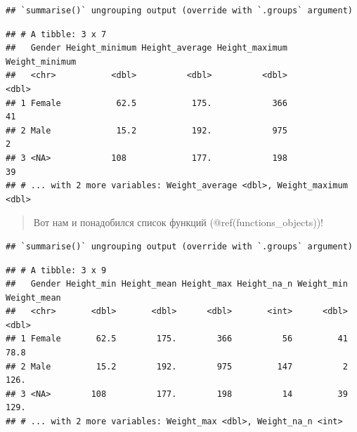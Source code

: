 \documentclass[]{book}
\newenvironment{Shaded}{\begin{snugshade}}{\end{snugshade}}
\newcommand{\KeywordTok}[1]{\textcolor[rgb]{0.13,0.29,0.53}{\textbf{#1}}}
\newcommand{\DataTypeTok}[1]{\textcolor[rgb]{0.13,0.29,0.53}{#1}}
\newcommand{\StringTok}[1]{\textcolor[rgb]{0.31,0.60,0.02}{#1}}
\newcommand{\OtherTok}[1]{\textcolor[rgb]{0.56,0.35,0.01}{#1}}
\newcommand{\ControlFlowTok}[1]{\textcolor[rgb]{0.13,0.29,0.53}{\textbf{#1}}}
\newcommand{\OperatorTok}[1]{\textcolor[rgb]{0.81,0.36,0.00}{\textbf{#1}}}
\newcommand{\NormalTok}[1]{#1}
\begin{document}
\begin{verbatim}
## `summarise()` ungrouping output (override with `.groups` argument)
\end{verbatim}

\begin{verbatim}
## # A tibble: 3 x 7
##   Gender Height_minimum Height_average Height_maximum Weight_minimum
##   <chr>           <dbl>          <dbl>          <dbl>          <dbl>
## 1 Female           62.5           175.            366             41
## 2 Male             15.2           192.            975              2
## 3 <NA>            108             177.            198             39
## # ... with 2 more variables: Weight_average <dbl>, Weight_maximum <dbl>
\end{verbatim}

\begin{quote}
Вот нам и понадобился список функций (@ref(functions\_objects))!
\end{quote}

\begin{Shaded}
\end{Shaded}

\begin{verbatim}
## `summarise()` ungrouping output (override with `.groups` argument)
\end{verbatim}

\begin{verbatim}
## # A tibble: 3 x 9
##   Gender Height_min Height_mean Height_max Height_na_n Weight_min Weight_mean
##   <chr>       <dbl>       <dbl>      <dbl>       <int>      <dbl>       <dbl>
## 1 Female       62.5        175.        366          56         41        78.8
## 2 Male         15.2        192.        975         147          2       126. 
## 3 <NA>        108          177.        198          14         39       129. 
## # ... with 2 more variables: Weight_max <dbl>, Weight_na_n <int>
\end{verbatim}
\end{document}
